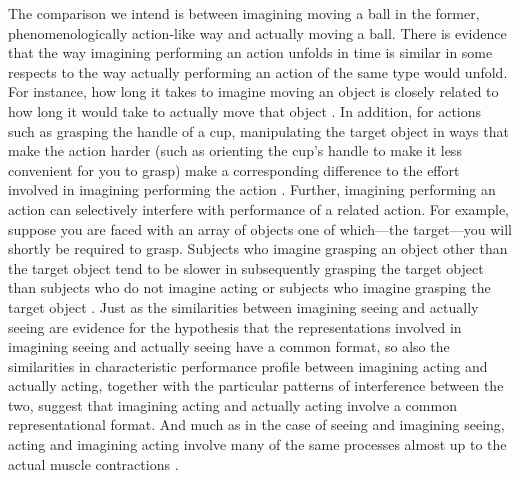 \documentclass[12pt,\papersize]{extarticle}
\begin{document}
The comparison we intend is between imagining moving a ball in the former, phenomenologically action-like way and actually moving a ball. There is evidence that the way imagining performing an action unfolds in time is similar in some respects to the way actually performing an action of the same type would unfold.  For instance, how long it takes to imagine moving an object is closely related to how long it would take to actually move that object \citep{decety:1989_timing, decety:1996_imagined, Jeannerod:1994oz}. In addition, for actions such as grasping the handle of a cup, manipulating the target object in ways that make the action harder (such as orienting the cup's handle to make it less convenient for you to grasp) make a corresponding difference to the effort involved in imagining performing the action \citep{parsons:1994_temporal, frak:2001_orientation}. Further, imagining performing an action can selectively interfere with performance of a related action. For example, suppose you are faced with an array of objects one of which---the target---you will shortly be required to grasp.  Subjects who imagine grasping an object other than the target object tend to be slower in subsequently grasping the target object than subjects who do not imagine acting or subjects who imagine grasping the target object \citep{ramsey:2010_incongruent_}. Just as the similarities between imagining seeing and actually seeing are evidence for the hypothesis that the representations involved in imagining seeing and actually seeing have a common format, so also the similarities in characteristic performance profile between imagining acting and actually acting, together with the particular patterns of interference between the two, suggest that imagining acting and actually acting involve a common representational format. And much as in the case of seeing and imagining seeing, acting and imagining acting involve many of the same processes almost up to the actual muscle contractions \citep{jeannerod:1995_mental, jeannerod:2003_mechanism}.
\end{document}
